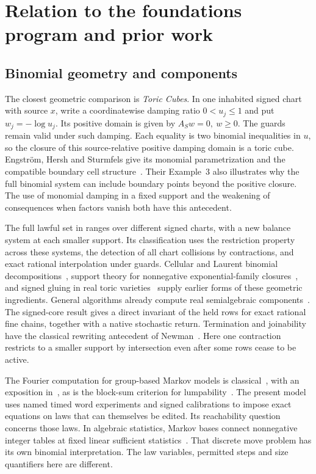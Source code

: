 \section{Relation to the foundations program and prior work}\label{sec:discussion}

\subsection{Binomial geometry and components}

The closest geometric comparison is \emph{Toric Cubes}. In one
inhabited signed chart with source \(x\), write a coordinatewise
damping ratio \(0<u_j\le1\) and put \(w_j=-\log u_j\).
Its positive domain is given by \(A_S w=0,\ w\ge0\).
The guards remain valid under such damping. Each equality is
two binomial inequalities in \(u\), so the closure of this
source-relative positive damping domain is a toric cube.
Engstr\"om, Hersh and Sturmfels give its monomial parametrization
and the compatible boundary cell structure~\citep[Lemma 1 and
Theorems 1--2]{toriccubes}. Their Example~3 also illustrates why
the full binomial system can include boundary points beyond the
positive closure. The use of monomial damping in a fixed support
and the weakening of consequences when factors vanish both
have this antecedent.

The full lawful set in  ranges over
different signed charts, with a new balance system at each smaller
support. Its classification uses the restriction property across
these systems, the detection of all chart collisions by contractions,
and exact rational interpolation under guards. Cellular and Laurent
binomial decompositions~\citep{eisenbudsturmfels}, support theory for
nonnegative exponential-family closures~\citep{geigermeeksturmfels,rauhkahleay},
and signed gluing in real toric varieties~\citep{sottile,soprunovasottile}
supply earlier forms of these geometric ingredients. General algorithms
already compute real semialgebraic components~\citep{basupollackroy}.
The signed-core result gives a direct invariant of the held rows
for exact rational fine chains, together with a native stochastic return.
Termination and joinability have the classical rewriting antecedent
of Newman~\citep{newman}. Here one contraction restricts to a smaller
support by intersection even after some rows cease to be active.

The Fourier computation for group-based Markov models is
classical~\citep{evansspeed,szekelysteelerdos}, with an exposition
in~\citep[Section 2 and Theorem 6]{sturmfelssullivant}, as is
the block-sum criterion for lumpability~\citep[Theorem 6.3.2]{kemenysnell}.
The present model uses named timed word experiments and signed
calibrations to impose exact equations on laws that can themselves
be edited. Its reachability question concerns those laws.
In algebraic statistics, Markov bases connect nonnegative integer
tables at fixed linear sufficient statistics~\citep[Theorem 3.1]{diaconissturmfels}.
That discrete move problem has its own binomial interpretation.
The law variables, permitted steps and size quantifiers here are
different.

